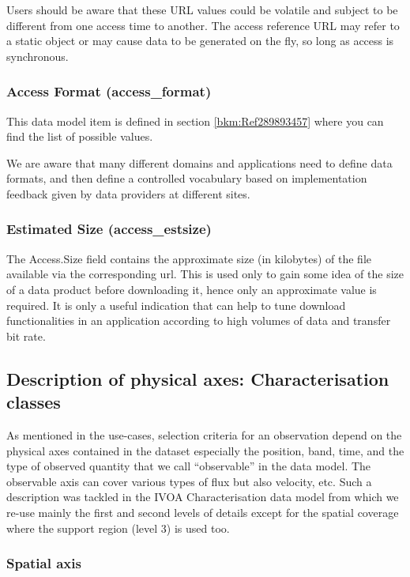 \documentclass[11pt,a4paper]{ivoa}
\begin{document}
Users should be aware that these URL values could be volatile and subject to be different from one access time to
another.  The access reference URL may refer to a static object or may cause data to be generated on the fly, so long
as access is synchronous.

\subsubsection{Access Format (access\_format)}
\label{bkm:Ref297463580}This data model item is defined in section \ref{bkm:Ref289893457} where you can find the list of
possible values.

We are aware that many different domains and applications need to define data formats, and then define a controlled
vocabulary based on implementation feedback given by data providers at different sites.

\subsubsection{Estimated Size (access\_estsize)}
The Access.Size field contains the approximate size (in kilobytes) of the file available via the corresponding url.
This is used only to gain some idea of the size of a data product before downloading it, hence only an approximate
value is required. It is only a useful indication that can help to tune download functionalities in an application
according to high volumes of data and transfer bit rate.

\subsection{Description of physical axes: Characterisation classes}
As mentioned in the use-cases, selection criteria for an observation depend on the physical axes contained in the
dataset especially the position, band, time, and the type of observed quantity that we call ``observable'' in the data
model. The observable axis can cover various types of flux but also velocity, etc.  Such a description was tackled in
the IVOA Characterisation data model \citep{2008ivoa.spec.0325L} from which we re-use mainly the first and second levels
of details except for the spatial coverage where the support region (level 3) is used too.

\subsubsection{Spatial axis}
\end{document}
